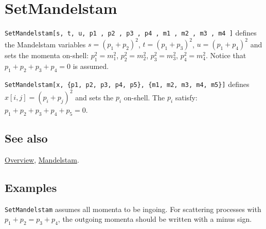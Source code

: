 \documentclass[../FeynCalcManual.tex]{subfiles}
\begin{document}
\hypertarget{setmandelstam}{%
\section{SetMandelstam}\label{setmandelstam}}

\texttt{SetMandelstam[\allowbreak{}s,\ \allowbreak{}t,\ \allowbreak{}u,\ \allowbreak{}p1 ,\ \allowbreak{}p2 ,\ \allowbreak{}p3 ,\ \allowbreak{}p4 ,\ \allowbreak{}m1 ,\ \allowbreak{}m2 ,\ \allowbreak{}m3 ,\ \allowbreak{}m4 ]}
defines the Mandelstam variables \(s=(p_1+p_2)^2\), \(t=(p_1+p_3)^2\),
\(u=(p_1+p_4)^2\) and sets the momenta on-shell: \(p_1^2=m_1^2\),
\(p_2^2=m_2^2\), \(p_3^2=m_3^2\), \(p_4^2=m_4^2\). Notice that
\(p_1+p_2+p_3+p_4=0\) is assumed.

\texttt{SetMandelstam[\allowbreak{}x,\ \allowbreak{}\{\allowbreak{}p1,\ \allowbreak{}p2,\ \allowbreak{}p3,\ \allowbreak{}p4,\ \allowbreak{}p5\},\ \allowbreak{}\{\allowbreak{}m1,\ \allowbreak{}m2,\ \allowbreak{}m3,\ \allowbreak{}m4,\ \allowbreak{}m5\}]}
defines \(x[i, j] = (p_i+p_j)^2\) and sets the \(p_i\) on-shell. The
\(p_i\) satisfy: \(p_1 + p_2 + p_3 + p_4 + p_5 = 0\).

\subsection{See also}

\hyperlink{toc}{Overview}, \hyperlink{mandelstam}{Mandelstam}.

\subsection{Examples}

\texttt{SetMandelstam} assumes all momenta to be ingoing. For scattering
processes with \(p_1+p_2=p_3+p_4\), the outgoing momenta should be
written with a minus sign.

\begin{Shaded}
\begin{Highlighting}[]
\OperatorTok{[]} 
 
\OperatorTok{[}\OperatorTok{,} \OperatorTok{,} \OperatorTok{,}\OperatorTok{,}\OperatorTok{,} \SpecialCharTok{{-}}\OperatorTok{,} \SpecialCharTok{{-}}\OperatorTok{,}\OperatorTok{,}\OperatorTok{,}\OperatorTok{,}\OperatorTok{]}\NormalTok{; }
 
\OperatorTok{[}\OperatorTok{,}\OperatorTok{]} 
 
\OperatorTok{[}\OperatorTok{,}\OperatorTok{]} 
 
\OperatorTok{[}\OperatorTok{,}\OperatorTok{]}
\end{Highlighting}
\end{Shaded}
\end{document}
